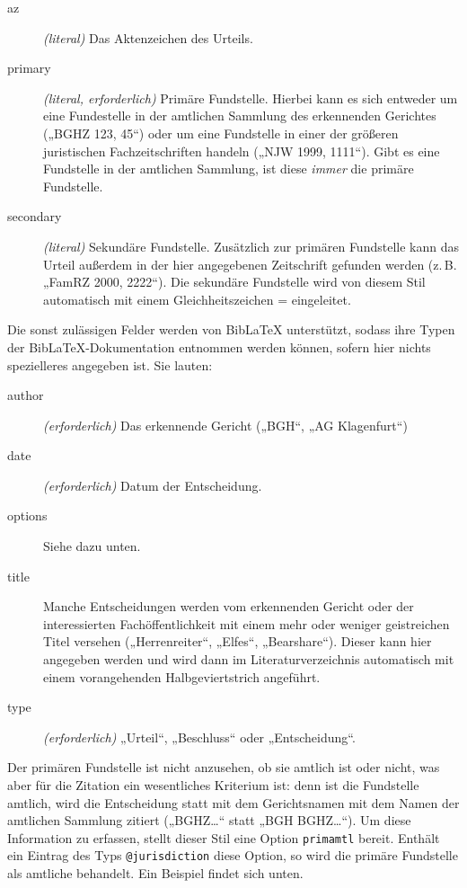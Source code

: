 \documentclass[11pt,a4paper,DIV=calc,draft]{scrartcl}
\newcommand\software[1]{\textsf{#1}}
\newcommand\Biblatex{\software{Bib\LaTeX{}}\xspace}
\newcommand\zB{z.\,B.\xspace}
\begin{document}
\begin{description}
\item[az] \emph{(literal)} Das Aktenzeichen des Urteils.
\item[primary] \emph{(literal, erforderlich)} Primäre
  Fundstelle. Hierbei kann es sich entweder um eine Fundestelle in der
  amtlichen Sammlung des erkennenden Gerichtes („BGHZ 123, 45“) oder
  um eine Fundstelle in einer der größeren juristischen
  Fachzeitschriften handeln („NJW 1999, 1111“). Gibt es eine
  Fundstelle in der amtlichen Sammlung, ist diese \emph{immer} die
  primäre Fundstelle.
\item[secondary] \emph{(literal)} Sekundäre Fundstelle. Zusätzlich zur
  primären Fundstelle kann das Urteil außerdem in der hier angegebenen
  Zeitschrift gefunden werden (\zB „FamRZ 2000, 2222“). Die sekundäre
  Fundstelle wird von diesem Stil automatisch mit einem
  Gleichheitszeichen = eingeleitet.
\end{description}

Die sonst zulässigen Felder werden von \Biblatex unterstützt, sodass
ihre Typen der \Biblatex-Do\-ku\-men\-ta\-tion entnommen werden können, sofern
hier nichts spezielleres angegeben ist. Sie lauten:

\begin{description}
\item[author] \emph{(erforderlich)} Das erkennende Gericht („BGH“, „AG Klagenfurt“)
\item[date] \emph{(erforderlich)} Datum der Entscheidung.
\item[options] Siehe dazu unten.
\item[title] Manche Entscheidungen werden vom erkennenden Gericht oder
  der interessierten Fachöffentlichkeit mit einem mehr oder weniger
  geistreichen Titel versehen („Herrenreiter“, „Elfes“,
  „Bearshare“). Dieser kann hier angegeben werden und wird dann im
  Literaturverzeichnis automatisch mit einem
  vorangehenden Halbgeviertstrich angeführt.
\item[type] \emph{(erforderlich)} „Urteil“, „Beschluss“ oder
  „Entscheidung“.
\end{description}

Der primären Fundstelle ist nicht anzusehen, ob sie amtlich ist oder
nicht, was aber für die Zitation ein wesentliches Kriterium ist: denn
ist die Fundstelle amtlich, wird die Entscheidung statt mit dem
Gerichtsnamen mit dem Namen der amtlichen Sammlung zitiert („BGHZ\ldots“
statt „BGH BGHZ\ldots“). Um diese Information zu erfassen, stellt
dieser Stil eine Option \verb+primamtl+ bereit. Enthält ein Eintrag
des Typs \verb+@jurisdiction+ diese Option, so wird die primäre
Fundstelle als amtliche behandelt. Ein Beispiel findet sich unten.
\end{document}
